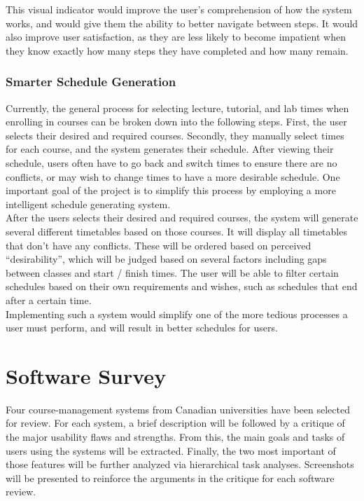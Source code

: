 \documentclass[10pt]{article}
\begin{document}
\begin{multicols}{2}
This visual indicator would improve the user's comprehension of how the system 
works, and would give them the ability to better navigate between steps. It 
would also improve user satisfaction, as they are less likely to become 
impatient when they know exactly how many steps they have completed and how many 
remain. 

\subsubsection*{Smarter Schedule Generation}
Currently, the general process for selecting lecture, tutorial, and lab times 
when enrolling in courses can be broken down into the following steps. First, 
the user selects their desired and required courses. Secondly, they manually 
select times for each course, and the system generates their schedule. After 
viewing their schedule, users often have to go back and switch times to ensure 
there are no conflicts, or may wish to change times to have a more desirable 
schedule. One important goal of the project is to simplify this process by 
employing a more intelligent schedule generating system.\\

After the users selects their desired and required courses, the system will 
generate several different timetables based on those courses. It will display 
all timetables that don't have any conflicts. These will be ordered based on 
perceived ``desirability'', which will be judged based on several factors 
including gaps between classes and start / finish times. The user will be able 
to filter certain schedules based on their own requirements and wishes, such as 
schedules that end after a certain time.\\

Implementing such a system would simplify one of the more tedious processes a 
user must perform, and will result in better schedules for users.

\section*{Software Survey}
Four course-management systems from Canadian universities have been selected for 
review. For each system, a brief description will be followed by a critique of 
the major usability flaws and strengths. From this, the main goals and tasks of 
users using the systems will be extracted. Finally, the two most important of 
those features will be further analyzed via hierarchical task analyses. 
Screenshots will be presented to reinforce the arguments in the critique for 
each software review.


\end{multicols}
\end{document}
